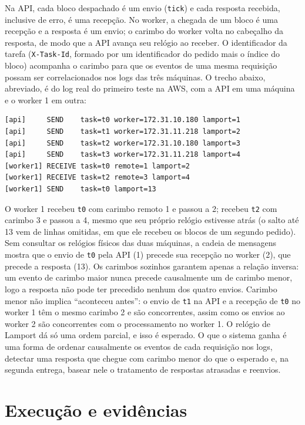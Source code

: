 \documentclass{sbc2023}
\begin{document}
Na API, cada bloco despachado é um envio (\texttt{tick}) e cada resposta recebida, inclusive de erro, é uma recepção. No worker, a chegada de um bloco é uma recepção e a resposta é um envio; o carimbo do worker volta no cabeçalho da resposta, de modo que a API avança seu relógio ao receber. O identificador da tarefa (\texttt{X-Task-Id}, formado por um identificador do pedido mais o índice do bloco) acompanha o carimbo para que os eventos de uma mesma requisição possam ser correlacionados nos logs das três máquinas. O trecho abaixo, abreviado, é do log real do primeiro teste na AWS, com a API em uma máquina e o worker 1 em outra:

{\scriptsize
\begin{verbatim}
[api]     SEND    task=t0 worker=172.31.10.180 lamport=1
[api]     SEND    task=t1 worker=172.31.11.218 lamport=2
[api]     SEND    task=t2 worker=172.31.10.180 lamport=3
[api]     SEND    task=t3 worker=172.31.11.218 lamport=4
[worker1] RECEIVE task=t0 remote=1 lamport=2
[worker1] RECEIVE task=t2 remote=3 lamport=4
[worker1] SEND    task=t0 lamport=13
\end{verbatim}}

O worker 1 recebeu \texttt{t0} com carimbo remoto 1 e passou a 2; recebeu \texttt{t2} com carimbo 3 e passou a 4, mesmo que seu próprio relógio estivesse atrás (o salto até 13 vem de linhas omitidas, em que ele recebeu os blocos de um segundo pedido). Sem consultar os relógios físicos das duas máquinas, a cadeia de mensagens mostra que o envio de \texttt{t0} pela API (1) precede sua recepção no worker (2), que precede a resposta (13). Os carimbos sozinhos garantem apenas a relação inversa: um evento de carimbo maior nunca precede causalmente um de carimbo menor, logo a resposta não pode ter precedido nenhum dos quatro envios. Carimbo menor não implica ``aconteceu antes'': o envio de \texttt{t1} na API e a recepção de \texttt{t0} no worker 1 têm o mesmo carimbo 2 e são concorrentes, assim como os envios ao worker 2 são concorrentes com o processamento no worker 1. O relógio de Lamport dá só uma ordem parcial, e isso é esperado. O que o sistema ganha é uma forma de ordenar causalmente os eventos de cada requisição nos logs, detectar uma resposta que chegue com carimbo menor do que o esperado e, na segunda entrega, basear nele o tratamento de respostas atrasadas e reenvios.

\section{Execução e evidências}
\label{sec:execucao}
\end{document}

